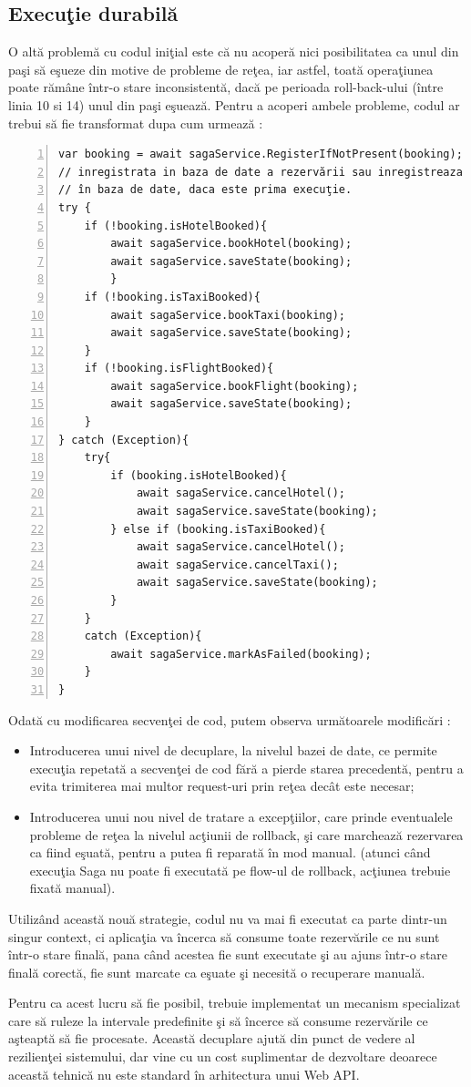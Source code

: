\subsection{Execuţie durabilă}
\par O altă problemă cu codul iniţial este că nu acoperă nici posibilitatea ca unul din paşi să eşueze din motive de probleme de reţea, iar astfel, toată operaţiunea poate rămâne într-o stare inconsistentă, dacă pe perioada roll-back-ului (între linia 10 si 14) unul din paşi eşuează. Pentru a acoperi ambele probleme, codul ar trebui să fie transformat dupa cum urmează : 
\begin{Verbatim}[numbers=left]
var booking = await sagaService.RegisterIfNotPresent(booking); // returneaza starea 
// inregistrata in baza de date a rezervării sau inregistreaza rezervarea 
// în baza de date, daca este prima execuţie.
try {
	if (!booking.isHotelBooked){
		await sagaService.bookHotel(booking);
		await sagaService.saveState(booking);
		}
	if (!booking.isTaxiBooked){
		await sagaService.bookTaxi(booking);
		await sagaService.saveState(booking);
	}
	if (!booking.isFlightBooked){
		await sagaService.bookFlight(booking);
		await sagaService.saveState(booking);
	}
} catch (Exception){
	try{
		if (booking.isHotelBooked){
			await sagaService.cancelHotel();
			await sagaService.saveState(booking);
		} else if (booking.isTaxiBooked){
			await sagaService.cancelHotel();
			await sagaService.cancelTaxi();
			await sagaService.saveState(booking);
		}
	}
	catch (Exception){
		await sagaService.markAsFailed(booking);
	}
}
\end{Verbatim}
Odată cu modificarea secvenţei de cod, putem observa următoarele modificări :
\begin{itemize}
\item Introducerea unui nivel de decuplare, la nivelul bazei de date, ce permite execuţia repetată a secvenţei de cod fără a pierde starea precedentă, pentru a evita trimiterea mai multor request-uri prin reţea decât este necesar; 
\item Introducerea unui nou nivel de tratare a excepţiilor, care prinde eventualele probleme de reţea la nivelul acţiunii de rollback, şi care marchează rezervarea ca fiind eşuată, pentru a putea fi reparată în mod manual. (atunci când execuţia Saga nu poate fi executată pe flow-ul de rollback, acţiunea trebuie fixată manual).
\end{itemize} 
Utilizând această nouă strategie, codul nu va mai fi executat ca parte dintr-un singur context, ci aplicaţia va încerca să consume toate rezervările ce nu sunt într-o stare finală, pana când acestea fie sunt executate şi au ajuns într-o stare finală corectă, fie sunt marcate ca eşuate şi necesită o recuperare manuală.
\par Pentru ca acest lucru să fie posibil, trebuie implementat un mecanism specializat care să ruleze la intervale predefinite şi să încerce să consume rezervările ce aşteaptă să fie procesate. Această decuplare ajută din punct de vedere al rezilienţei sistemului, dar vine cu un cost suplimentar de dezvoltare deoarece această tehnică nu este standard în arhitectura unui Web API.  

